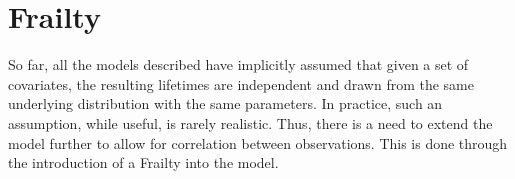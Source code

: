 





\section*{Frailty}

So far, all the models described have implicitly assumed that given a set of covariates, the resulting lifetimes are independent and drawn from the same underlying distribution with the same parameters. In practice, such an assumption, while useful, is rarely realistic. Thus, there is a need to extend the model further to allow for correlation between observations. This is done through the introduction of a Frailty into the model.

